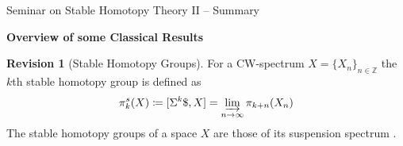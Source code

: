 \documentclass[english]{scrartcl}
\theoremstyle{definition}
\newtheorem*{Rev}{Revision}
\theoremstyle{remark}
\newcommand*{\idest}{i.\,e.\ }
\newcommand*{\N}{\mathds{N}}
\newcommand*{\Z}{\mathds{Z}}
\newcommand*{\susp}{\Sigma}  %
\newcommand*{\SphS}{\ensuremath{\$}} %
\begin{document}
\clearpairofpagestyles
{}
\cfoot*{\pagemark}

\begin{center}
  Seminar on Stable Homotopy Theory II – Summary\par
  \medskip
  {\Large\bfseries Overview of some Classical Results}
\end{center}
\smallskip



\begin{Rev}[Stable Homotopy Groups]
  For a CW-spectrum $X=\{X_n\}_{n\in\Z}$ the $k$th stable homotopy group
  is defined as
  \begin{gather*}
    \pi_k^s(X)
    \coloneqq [\susp^k \SphS, X]
    = \varinjlim_{n\to\infty} \pi_{k+n}(X_n)
  \end{gather*}
  The stable homotopy groups of a space $X$ are those of its
  suspension spectrum%
  .
\end{Rev}
\end{document}
